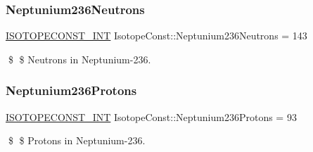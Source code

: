 \subsubsection{\texorpdfstring{Neptunium236\+Neutrons}{Neptunium236Neutrons}}
{\footnotesize\ttfamily \mbox{\hyperlink{group___isotope_const-_macros_ga5f18360b3e99483a35c32d789e62621c}{I\+S\+O\+T\+O\+P\+E\+C\+O\+N\+S\+T\+\_\+\+I\+NT}} Isotope\+Const\+::\+Neptunium236\+Neutrons = 143}

\$ \$ Neutrons in Neptunium-\/236. \mbox{\label{group___isotope_const-_neptunium-_np236_ga0aea6f4c8e7b7e445d0e12d4df4061a8}} 
\subsubsection{\texorpdfstring{Neptunium236\+Protons}{Neptunium236Protons}}
{\footnotesize\ttfamily \mbox{\hyperlink{group___isotope_const-_macros_ga5f18360b3e99483a35c32d789e62621c}{I\+S\+O\+T\+O\+P\+E\+C\+O\+N\+S\+T\+\_\+\+I\+NT}} Isotope\+Const\+::\+Neptunium236\+Protons = 93}

\$ \$ Protons in Neptunium-\/236. 